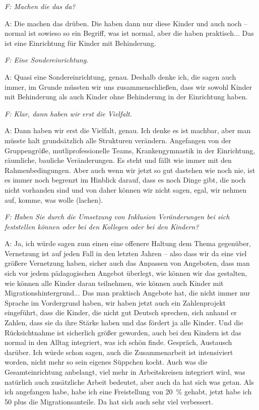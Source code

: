 \emph{F: Machen die das da?}

A: Die machen das drüben. Die haben dann nur diese Kinder und auch noch -- normal ist sowieso so ein Begriff, was ist normal, aber die haben praktisch... Das ist eine Einrichtung für Kinder mit Behinderung. 

\emph{F: Eine Sondereinrichtung.}

A: Quasi eine Sondereinrichtung, genau.
Deshalb denke ich, die sagen auch immer, im Grunde müssten wir uns zusammenschließen, dass wir sowohl Kinder mit Behinderung als auch Kinder ohne Behinderung in der Einrichtung haben.

\emph{F: Klar, dann haben wir erst die Vielfalt.}

A: Dann haben wir erst die Vielfalt, genau. Ich denke es ist machbar, aber man müsste halt grundsätzlich alle Strukturen verändern. Angefangen von der Gruppengröße, mutliprofessionelle Teams, Krankengymnastik in der Einrichtung, räumliche, bauliche Veränderungen. Es steht und fällt wie immer mit den Rahmenbedingungen. 
Aber auch wenn wir jetzt so gut dastehen wie noch nie, ist es immer noch begrenzt im Hinblick darauf, dass es noch Dinge gibt, die noch nicht vorhanden sind und von daher können wir nicht sagen, egal, wir nehmen auf, komme, was wolle (lachen).

\emph{F: Haben Sie durch die Umsetzung von Inklusion Veränderungen bei sich feststellen können oder bei den Kollegen oder bei den Kindern?} 

A: Ja, ich würde sagen zum einen eine offenere Haltung dem Thema gegenüber, Vernetzung ist auf jeden Fall in den letzten Jahren -- also dass wir da eine viel größere Vernetzung haben, sicher auch das Anpassen von Angeboten, dass man sich vor jedem pädagogischen Angebot überlegt, wie können wir das gestalten, wie können alle Kinder daran teilnehmen, wie können auch Kinder mit Migrationshintergrund... Das man praktisch Angebote hat, die nicht immer nur Sprache im Vordergrund haben, wir haben jetzt auch ein  Zahlenprojekt eingeführt, dass die Kinder, die nicht gut Deutsch sprechen, sich anhand er Zahlen, dass sie da ihre Stärke haben und das fördert ja alle Kinder. Und die Rücksichtnahme ist sicherlich größer geworden, auch bei den Kindern ist das normal in den Alltag integriert, was ich schön finde. Gespräch, Austausch darüber. Ich würde schon sagen, auch die Zusammenarbeit ist intensiviert worden, nicht mehr so sein eigenes Süppchen kocht. Auch was die Gesamteinrichtung anbelangt, viel mehr in Arbeitskreisen integriert wird, was natürlich auch zusätzliche Arbeit bedeutet, aber auch da hat sich was getan. Als ich angefangen habe, habe ich eine Freistellung von 20~\% gehabt, jetzt habe ich 50 plus die Migrationsanteile. Da hat sich auch sehr viel verbessert. 

